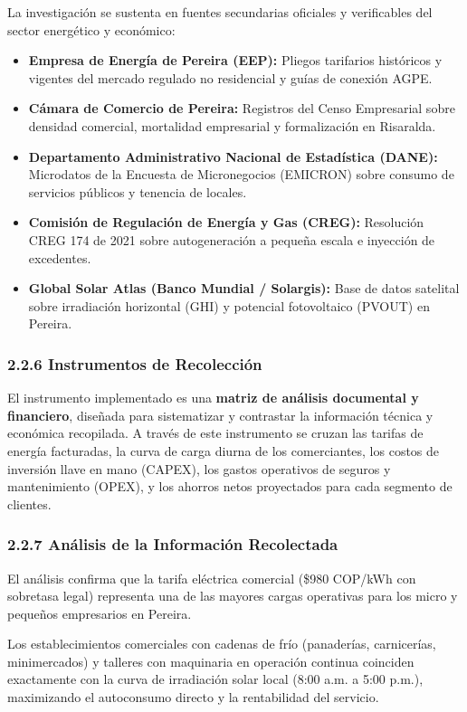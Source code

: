 \documentclass[12pt,letterpaper]{article}
\begin{document}
La investigación se sustenta en fuentes secundarias oficiales y verificables del sector energético y económico:
\begin{itemize}[leftmargin=1.5em, itemsep=1.5pt]
    \item \textbf{Empresa de Energía de Pereira (EEP):} Pliegos tarifarios históricos y vigentes del mercado regulado no residencial y guías de conexión AGPE.
    \item \textbf{Cámara de Comercio de Pereira:} Registros del Censo Empresarial sobre densidad comercial, mortalidad empresarial y formalización en Risaralda.
    \item \textbf{Departamento Administrativo Nacional de Estadística (DANE):} Microdatos de la Encuesta de Micronegocios (EMICRON) sobre consumo de servicios públicos y tenencia de locales.
    \item \textbf{Comisión de Regulación de Energía y Gas (CREG):} Resolución CREG 174 de 2021 sobre autogeneración a pequeña escala e inyección de excedentes.
    \item \textbf{Global Solar Atlas (Banco Mundial / Solargis):} Base de datos satelital sobre irradiación horizontal (GHI) y potencial fotovoltaico (PVOUT) en Pereira.
\end{itemize}

\subsubsection{2.2.6 Instrumentos de Recolección}

El instrumento implementado es una \textbf{matriz de análisis documental y financiero}, diseñada para sistematizar y contrastar la información técnica y económica recopilada. A través de este instrumento se cruzan las tarifas de energía facturadas, la curva de carga diurna de los comerciantes, los costos de inversión llave en mano (CAPEX), los gastos operativos de seguros y mantenimiento (OPEX), y los ahorros netos proyectados para cada segmento de clientes.

\subsubsection{2.2.7 Análisis de la Información Recolectada}

El análisis confirma que la tarifa eléctrica comercial (\$980 COP/kWh con sobretasa legal) representa una de las mayores cargas operativas para los micro y pequeños empresarios en Pereira.

Los establecimientos comerciales con cadenas de frío (panaderías, carnicerías, minimercados) y talleres con maquinaria en operación continua coinciden exactamente con la curva de irradiación solar local (8:00 a.m. a 5:00 p.m.), maximizando el autoconsumo directo y la rentabilidad del servicio.
\end{document}
